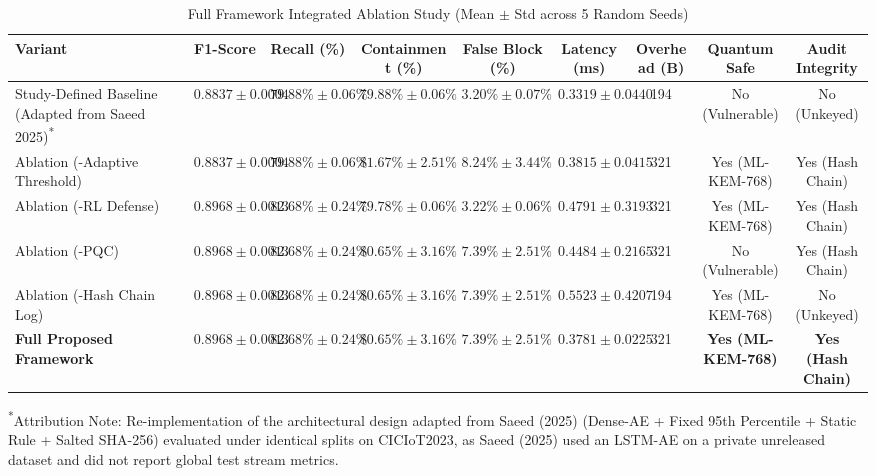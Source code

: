 \documentclass[journal]{IEEEtran}
\begin{document}
\begin{table}[t]
\centering
\caption{Full Framework Integrated Ablation Study (Mean $\pm$ Std across 5 Random Seeds)}
\label{tab:e7_ablation}
\begin{tabular}{lcccccccc}
\toprule
Variant & F1-Score & Recall (\%) & Containment (\%) & False Block (\%) & Latency (ms) & Overhead (B) & Quantum Safe & Audit Integrity \\
\midrule
Study-Defined Baseline (Adapted from Saeed 2025)\textsuperscript{*} & $0.8837 \pm 0.0004$ & $79.88\% \pm 0.06\%$ & $79.88\% \pm 0.06\%$ & $3.20\% \pm 0.07\%$ & $0.3319 \pm 0.0440$ & 194 & No (Vulnerable) & No (Unkeyed) \\
Ablation (-Adaptive Threshold) & $0.8837 \pm 0.0004$ & $79.88\% \pm 0.06\%$ & $81.67\% \pm 2.51\%$ & $8.24\% \pm 3.44\%$ & $0.3815 \pm 0.0415$ & 321 & Yes (ML-KEM-768) & Yes (Hash Chain) \\
Ablation (-RL Defense) & $0.8968 \pm 0.0013$ & $82.68\% \pm 0.24\%$ & $79.78\% \pm 0.06\%$ & $3.22\% \pm 0.06\%$ & $0.4791 \pm 0.3193$ & 321 & Yes (ML-KEM-768) & Yes (Hash Chain) \\
Ablation (-PQC) & $0.8968 \pm 0.0013$ & $82.68\% \pm 0.24\%$ & $80.65\% \pm 3.16\%$ & $7.39\% \pm 2.51\%$ & $0.4484 \pm 0.2165$ & 321 & No (Vulnerable) & Yes (Hash Chain) \\
Ablation (-Hash Chain Log) & $0.8968 \pm 0.0013$ & $82.68\% \pm 0.24\%$ & $80.65\% \pm 3.16\%$ & $7.39\% \pm 2.51\%$ & $0.5523 \pm 0.4207$ & 194 & Yes (ML-KEM-768) & No (Unkeyed) \\
\textbf{Full Proposed Framework} & $\mathbf{0.8968 \pm 0.0013}$ & $\mathbf{82.68\% \pm 0.24\%}$ & $\mathbf{80.65\% \pm 3.16\%}$ & $7.39\% \pm 2.51\%$ & $\mathbf{0.3781 \pm 0.0225}$ & 321 & \textbf{Yes (ML-KEM-768)} & \textbf{Yes (Hash Chain)} \\
\bottomrule
\end{tabular}
\vspace{1ex}
\begin{flushleft}
\small\textsuperscript{*}Attribution Note: Re-implementation of the architectural design adapted from Saeed (2025) (Dense-AE + Fixed 95th Percentile + Static Rule + Salted SHA-256) evaluated under identical splits on CICIoT2023, as Saeed (2025) used an LSTM-AE on a private unreleased dataset and did not report global test stream metrics.
\end{flushleft}
\end{table}
\end{document}
